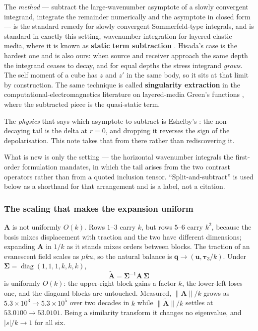 \documentclass[11pt,a4paper]{article}
\newcommand{\bA}{\mathbf{A}}
\newcommand{\bq}{\mathbf{q}}
\newcommand{\bu}{\mathbf{u}}
\newcommand{\bta}{\boldsymbol{\tau}}
\newcommand{\bSig}{\boldsymbol{\Sigma}}
\begin{document}
The \emph{method} --- subtract the large-wavenumber asymptote of a slowly
convergent integrand, integrate the remainder numerically and the asymptote in
closed form --- is the standard remedy for slowly convergent Sommerfeld-type
integrals, and is standard in exactly this setting, wavenumber integration for
layered elastic media, where it is known as \textbf{static term subtraction}
\cite{hisada1994,hisada1995,luco1983}.  Hisada's case is the hardest one and is
also ours: when source and receiver approach the same depth the integrand ceases
to decay, and for equal depths the stress integrand \emph{grows}.  The self
moment of a cube has $z$ and $z'$ in the same body, so it sits at that limit by
construction.  The same technique is called \textbf{singularity extraction} in
the computational-electromagnetics literature on layered-media Green's functions
\cite{michalski1997}, where the subtracted piece is the quasi-static term.

The \emph{physics} that says which asymptote to subtract is Eshelby's
\cite{eshelby1957,mura1987}: the non-decaying tail is the delta at $r=0$, and
dropping it reverses the sign of the depolarisation.  This note takes that from
there rather than rediscovering it.

What is new is only the setting --- the horizontal wavenumber integrals the
first-order formulation mandates, in which the tail arises from the two contrast
operators rather than from a quoted inclusion tensor.  ``Split-and-subtract'' is
used below as a shorthand for that arrangement and is a label, not a citation.

\subsubsection{The scaling that makes the expansion uniform}

$\bA$ is not uniformly $O(k)$.  Rows $1$--$3$ carry $k$, but rows $5$--$6$ carry
$k^2$, because the basis mixes displacement with traction and the two have
different dimensions; expanding $\bA$ in $1/k$ as it stands mixes orders between
blocks.  The traction of an evanescent field scales as $\mu k u$, so the natural
balance is $\bq \to (\bu, \bta_3/k)$.  Under
$\bSig = \operatorname{diag}(1,1,1,k,k,k)$,
\begin{equation}\label{eq:scaling}
  \widetilde{\bA} = \bSig^{-1}\bA\,\bSig
\end{equation}
is uniformly $O(k)$: the upper-right block gains a factor $k$, the lower-left
loses one, and the diagonal blocks are untouched.  Measured, $\|\bA\|/k$ grows
as $5.3\times10^{3} \to 5.3\times10^{5}$ over two decades in $k$ while
$\|\widetilde{\bA}\|/k$ settles at $53.0100 \to 53.0101$.  Being a similarity
transform it changes no eigenvalue, and $|s|/k \to 1$ for all six.
\end{document}
